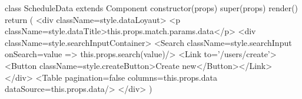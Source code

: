 class ScheduleData extends Component {
  constructor(props) {super(props)}
  render() {
    return (
      <div className={style.dataLoyaut}>
      <p className={style.dataTitle}>{this.props.match.params.data}</p>
       <div className={style.searchInputContainer}>
          <Search className={style.searchInput} onSearch={value => this.props.search(value)}/>
          <Link to='/users/create'><Button className={style.createButton}>Create new</Button></Link>
        </div>
        <Table pagination={false} columns={this.props.data} dataSource={this.props.data}/>
      </div>
    )
  }
}